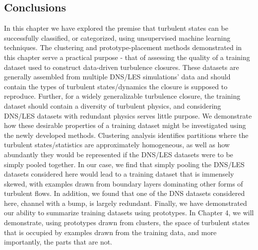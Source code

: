 \subsection{Conclusions}
In this chapter we have explored the premise that turbulent states can be successfully classiﬁed, or
categorized, using unsupervised machine learning techniques. The clustering and prototype-placement
methods demonstrated in this chapter serve a practical purpose - that of assessing the quality of a training dataset used to construct data-driven turbulence closures. These datasets are generally assembled from multiple DNS/LES simulations’ data and should contain the types of turbulent states/dynamics the closure is supposed to reproduce. Further, for a widely generalizable turbulence closure, the training dataset should contain a diversity of turbulent physics, and considering DNS/LES datasets with redundant physics serves little purpose. We demonstrate how these desirable properties of a training dataset might be investigated using the newly developed methods. Clustering analysis identiﬁes partitions where the turbulent states/statistics are approximately homogeneous, as well as how abundantly they would be represented if the DNS/LES datasets were to be simply pooled together. In our case, we ﬁnd that simply pooling the DNS/LES datasets considered here would lead to a training dataset that is immensely skewed, with examples drawn from boundary layers dominating other forms of turbulent ﬂows. In addition, we found
that one of the DNS datasets considered here, channel with a bump, is largely redundant. Finally, we have
demonstrated our ability to summarize training datasets using prototypes. In Chapter 4, we will
demonstrate, using prototypes drawn from clusters, the space of turbulent states that is occupied by
examples drawn from the training data, and more importantly, the parts that are not.

